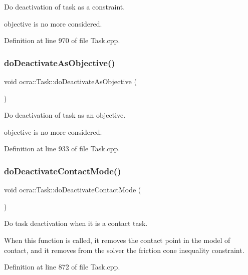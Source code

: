 Do deactivation of task as a constraint.

objective is no more considered. 

Definition at line 970 of file Task.\+cpp.

\hypertarget{classocra_1_1Task_af2874b0d97d3fb735dc5a49c0f80a717}{}\label{classocra_1_1Task_af2874b0d97d3fb735dc5a49c0f80a717} 
\subsubsection{\texorpdfstring{do\+Deactivate\+As\+Objective()}{doDeactivateAsObjective()}}
{\footnotesize\ttfamily void ocra\+::\+Task\+::do\+Deactivate\+As\+Objective (\begin{DoxyParamCaption}{ }\end{DoxyParamCaption})\hspace{0.3cm}{\ttfamily [protected]}}

Do deactivation of task as an objective.

objective is no more considered. 

Definition at line 933 of file Task.\+cpp.

\hypertarget{classocra_1_1Task_a98cfb17f9df4e27b5c1d9cc2bf0faa9e}{}\label{classocra_1_1Task_a98cfb17f9df4e27b5c1d9cc2bf0faa9e} 
\subsubsection{\texorpdfstring{do\+Deactivate\+Contact\+Mode()}{doDeactivateContactMode()}}
{\footnotesize\ttfamily void ocra\+::\+Task\+::do\+Deactivate\+Contact\+Mode (\begin{DoxyParamCaption}{ }\end{DoxyParamCaption})\hspace{0.3cm}{\ttfamily [protected]}}

Do task deactivation when it is a contact task.

When this function is called, it removes the contact point in the model of contact, and it removes from the solver the friction cone inequality constraint. 

Definition at line 872 of file Task.\+cpp.

